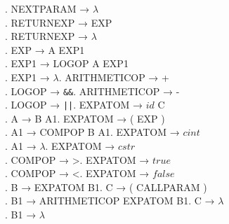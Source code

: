 \begin{tabbing}
    . NEXTPARAM → $\lambda$\\
    . RETURNEXP → EXP\\
    . RETURNEXP → $\lambda$\\
    . EXP → A EXP1\\
    . EXP1 → LOGOP A EXP1\\
    . EXP1 → $\lambda$. ARITHMETICOP → +\\
    . LOGOP → \verb!&&!. ARITHMETICOP → -\\
    . LOGOP → \verb!||!. EXPATOM → $id$ C\\
    . A → B A1. EXPATOM → ( EXP )\\
    . A1 → COMPOP B A1. EXPATOM → $cint$\\
    . A1 → $\lambda$. EXPATOM → $cstr$\\
    . COMPOP → >. EXPATOM → $true$\\
    . COMPOP → <. EXPATOM → $false$\\
    . B → EXPATOM B1. C → ( CALLPARAM )\\
    . B1 → ARITHMETICOP EXPATOM B1. C → $\lambda$\\
    . B1 → $\lambda$\\
\end{tabbing}